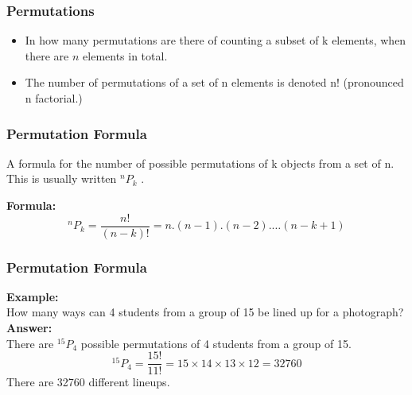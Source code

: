 \documentclass{beamer}
\begin{document}
\begin{frame}
\frametitle{Permutations}
\large
\begin{itemize}
\item In how many permutations are there of counting a subset of k elements, when there are $n$ elements in total.

\item The number of permutations of a set of n elements is denoted n! (pronounced n factorial.)
\end{itemize}
\end{frame}
\begin{frame}
\frametitle{Permutation Formula}

A formula for the number of possible permutations of k objects from a set of n. This is usually written $^nP_k$ .

\bigskip
\textbf{Formula:}	
\[ ^nP_k = \frac{n!}{(n-k)!} =  n.(n-1).(n-2).\ldots(n-k+1) \]

\end{frame}
\begin{frame}
\frametitle{Permutation Formula}

\textbf{Example:}\\	
How many ways can 4 students from a group of 15 be lined up for a photograph?\\
\bigskip
\textbf{Answer:	}\\
There are $^{15}P_4$ possible permutations of 4 students from a group of 15.
\[ ^{15}P_4 = \frac{15!}{11!} = 15\times 14\times 13\times 12 = 32760 \]
There are 32760 different lineups.
\end{frame}
\end{document}
